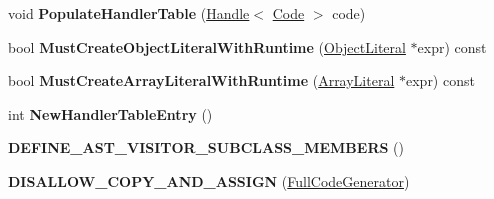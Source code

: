 \begin{DoxyCompactItemize}
\item 
void {\bfseries Populate\+Handler\+Table} (\hyperlink{classv8_1_1internal_1_1_handle}{Handle}$<$ \hyperlink{classv8_1_1internal_1_1_code}{Code} $>$ code)\hypertarget{classv8_1_1internal_1_1_full_code_generator_a9683573fe766d4c94bb2839cda6af84d}{}\label{classv8_1_1internal_1_1_full_code_generator_a9683573fe766d4c94bb2839cda6af84d}

\item 
bool {\bfseries Must\+Create\+Object\+Literal\+With\+Runtime} (\hyperlink{classv8_1_1internal_1_1_object_literal}{Object\+Literal} $\ast$expr) const \hypertarget{classv8_1_1internal_1_1_full_code_generator_ae574e30534cfc1080ba6e91020f3b14d}{}\label{classv8_1_1internal_1_1_full_code_generator_ae574e30534cfc1080ba6e91020f3b14d}

\item 
bool {\bfseries Must\+Create\+Array\+Literal\+With\+Runtime} (\hyperlink{classv8_1_1internal_1_1_array_literal}{Array\+Literal} $\ast$expr) const \hypertarget{classv8_1_1internal_1_1_full_code_generator_ac249dcedb51592060c37fd47d6bba152}{}\label{classv8_1_1internal_1_1_full_code_generator_ac249dcedb51592060c37fd47d6bba152}

\item 
int {\bfseries New\+Handler\+Table\+Entry} ()\hypertarget{classv8_1_1internal_1_1_full_code_generator_a700f2d9926519e8a48a3098d7d0dfd0e}{}\label{classv8_1_1internal_1_1_full_code_generator_a700f2d9926519e8a48a3098d7d0dfd0e}

\item 
{\bfseries D\+E\+F\+I\+N\+E\+\_\+\+A\+S\+T\+\_\+\+V\+I\+S\+I\+T\+O\+R\+\_\+\+S\+U\+B\+C\+L\+A\+S\+S\+\_\+\+M\+E\+M\+B\+E\+RS} ()\hypertarget{classv8_1_1internal_1_1_full_code_generator_a58d34b9ce262ae7e1d9fd00fcebcd52c}{}\label{classv8_1_1internal_1_1_full_code_generator_a58d34b9ce262ae7e1d9fd00fcebcd52c}

\item 
{\bfseries D\+I\+S\+A\+L\+L\+O\+W\+\_\+\+C\+O\+P\+Y\+\_\+\+A\+N\+D\+\_\+\+A\+S\+S\+I\+GN} (\hyperlink{classv8_1_1internal_1_1_full_code_generator}{Full\+Code\+Generator})\hypertarget{classv8_1_1internal_1_1_full_code_generator_a542f350e8a640af5402476aeae392952}{}\label{classv8_1_1internal_1_1_full_code_generator_a542f350e8a640af5402476aeae392952}

\end{DoxyCompactItemize}
